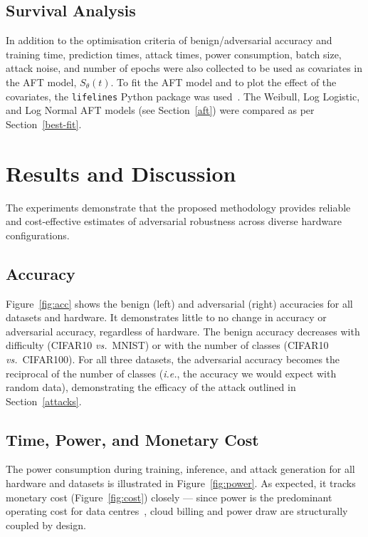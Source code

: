 \documentclass[conference]{IEEEtran}%
\begin{document}
\subsection{Survival Analysis}

In addition to the optimisation criteria of benign/adversarial accuracy and training time, prediction times, attack times, power consumption, batch size, attack noise, and number of epochs were also collected to be used as covariates in the AFT model, $S_{\theta}(t)$. 
To fit the AFT model and to plot the effect of the covariates, the \texttt{lifelines} Python package was used~\cite{lifelines}. 
The Weibull, Log Logistic, and Log Normal AFT models (see Section~\ref{aft}) were compared as per Section~\ref{best-fit}.


\section{Results and Discussion}
\label{results}

The experiments demonstrate that the proposed methodology provides reliable and cost-effective estimates of adversarial robustness across diverse hardware configurations. 
\subsection{Accuracy}
\label{res:acc}

Figure~\ref{fig:acc} shows the benign (left) and adversarial (right) accuracies for all datasets and hardware. 
It demonstrates little to no change in accuracy or adversarial accuracy, regardless of hardware. 
The benign accuracy decreases with difficulty (CIFAR10 \textit{vs.}~MNIST) or with the number of classes (CIFAR10 \textit{vs.}~CIFAR100). 
For all three datasets, the adversarial accuracy becomes the reciprocal of the number of classes (\textit{i.e.}, the accuracy we would expect with random data), demonstrating the efficacy of the attack outlined in Section~\ref{attacks}. 

\subsection{Time, Power, and Monetary Cost}
\label{res:cost}
The power consumption during training, inference, and attack generation for all hardware and datasets is illustrated in Figure~\ref{fig:power}. 
As expected, it tracks monetary cost (Figure~\ref{fig:cost}) closely --- since power is the predominant operating cost for data centres~\cite{dayarathna2015data}, cloud billing and power draw are structurally coupled by design. 
\end{document}

